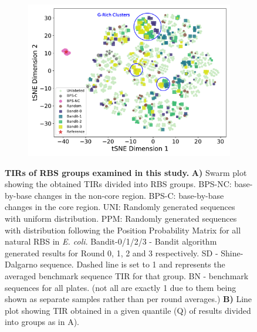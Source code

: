 \documentclass{scrartcl}[2013/05/29]%
\begin{document}
\begin{figure}[!ht]
\begin{subfigure}[b]{0.48\textwidth}
    \end{subfigure}
    \begin{subfigure}[b]{0.48\textwidth}
        \centering
        \caption{}
        \includegraphics[scale=0.42]{plots/Main_Paper/tsneplot.pdf}
    \end{subfigure}
    \caption{
    \textbf{TIRs of RBS groups examined in this study.}
    \textbf{A)} Swarm plot showing the obtained TIRs divided into RBS groups.
    BPS-NC: base-by-base changes in the non-core region.
    BPS-C: base-by-base changes in the core region.
    UNI: Randomly generated sequences with uniform distribution.
    PPM: Randomly generated sequences with distribution following the Position Probability Matrix for all natural RBS in \emph{E. coli}.
    Bandit-0/1/2/3 - Bandit algorithm generated results for Round 0, 1, 2 and 3 respectively.
    SD - Shine-Dalgarno sequence.
    Dashed line is set to 1 and represents the averaged benchmark sequence TIR for that group.
    BN - benchmark sequences for all plates.
    (not all are exactly 1 due to them being shown as separate samples rather than per round averages.)
    \textbf{B)} Line plot showing TIR obtained in a given quantile (Q) of results divided into groups as in A).
}
\end{figure}
\end{document}
